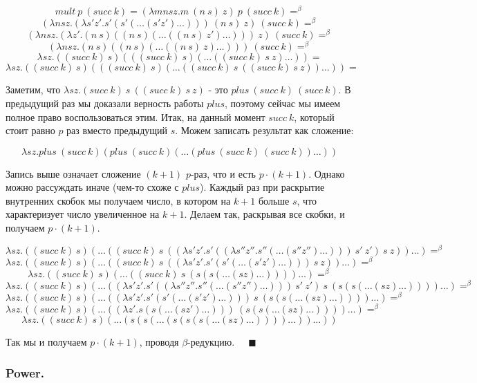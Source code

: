 \documentclass[a4paper,12pt]{article}
\theoremstyle{plain} %
\theoremstyle{definition} %
\theoremstyle{remark} %
\begin{document}
$$mult \ p \ (succ \ k) = (\lambda m n s z. m \ (n \ s) \ z) \ p \ (succ \ k) =^{\beta}$$
$$(\lambda n s z. (\lambda s'z'.s'(s'(\dots(s'z')\dots))) \ (n \ s) \ z) \ (succ \ k) =^{\beta}$$
$$(\lambda n s z. (\lambda z'.(n \ s)((n \ s)(\dots((n \ s) \ z')\dots))) \ z) \ (succ \ k) =^{\beta}$$
$$(\lambda n s z. (n \ s)((n \ s)(\dots((n \ s) \ z)\dots))) \ (succ \ k) =^{\beta}$$
$$\lambda s z. ((succ \ k) \ s)(((succ \ k) \ s)(\dots((succ \ k) \ s \ z)\dots)) =$$
$$\lambda s z. ((succ \ k) \ s)(((succ \ k) \ s)(\dots((succ \ k) \ s \ ((succ \ k) \ s \ z))\dots)) =$$


Заметим, что $\lambda sz. (succ \ k) \ s \ ((succ \ k) \ s \ z)$ - это $plus \ (succ \ k) \ (succ \ k)$. В предыдущий раз мы доказали верность работы $plus$, поэтому сейчас мы имеем полное право воспользоваться этим. 
Итак, на данный момент $succ \ k$, который стоит равно $p$ раз вместо предыдущий $s$. Можем записать результат как сложение:

$$\lambda sz. plus \ (succ \ k) (plus \ (succ \  k) (\dots (plus \ (succ \ k) \ (succ \ k)) \dots))$$

Запись выше означает сложение $(k + 1)$ $p$-раз, что и есть $p \cdot (k + 1)$. Однако можно рассуждать иначе (чем-то схоже с $plus$). Каждый раз при раскрытие внутренних скобок мы получаем число, в котором на $k+1$ больше $s$, что характеризует число увеличенное на $k+1$. Делаем так, раскрывая все скобки, и получаем $p \cdot (k + 1)$.

$$\lambda s z. ((succ \ k) \ s)(\dots((succ \ k) \ s \ ((\lambda s'z'. s'((\lambda s''z''. s''(\dots (s''z'') \dots))) \ s' \ z') \ s \ z))\dots) =^{\beta}$$
$$\lambda s z. ((succ \ k) \ s)(\dots((succ \ k) \ s \ ((\lambda s'z'. s'(s'(\dots (s'z') \dots))) \ s \ z))\dots) =^{\beta}$$
$$\lambda s z. ((succ \ k) \ s)(\dots((succ \ k) \ s \ (s(s(\dots (sz) \dots))))\dots) =^{\beta}$$
$$\lambda s z. ((succ \ k) \ s)(\dots((\lambda s'z'. s'((\lambda s''z''. s''(\dots (s''z'') \dots))) \ s' \ z') \ s \ (s(s(\dots (sz) \dots))))\dots) =^{\beta}$$
$$\lambda s z. ((succ \ k) \ s)(\dots((\lambda s'z'. s'(s'(\dots (s'z') \dots))) \ s \ (s(s(\dots (sz) \dots))))\dots) =^{\beta}$$
$$\lambda s z. ((succ \ k) \ s)(\dots((\lambda z'. s(s(\dots (sz') \dots))) \ (s(s(\dots (sz) \dots))))\dots) =^{\beta}$$
$$\lambda s z. ((succ \ k) \ s)(\dots(s(s(\dots (s(s(s(\dots (sz) \dots))))\dots)) \dots))$$

Так мы и получаем $p\cdot (k + 1)$, проводя $\beta$-редукцию. $\ \ \ \ \ \blacksquare$

\subsubsection{Power.}
\end{document}
